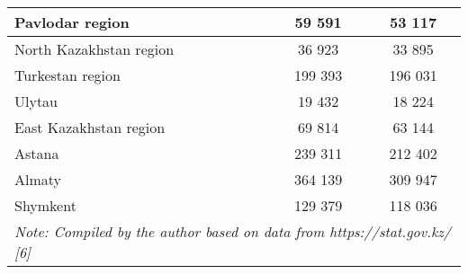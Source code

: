 \begin{table}[H]
\begin{tabular}{|lcc|}
\multicolumn{1}{|l|}{Pavlodar region}         & \multicolumn{1}{c|}{59 591}        & 53 117                       \\ \hline
\multicolumn{1}{|l|}{North Kazakhstan region} & \multicolumn{1}{c|}{36 923}        & 33 895                       \\ \hline
\multicolumn{1}{|l|}{Turkestan region}        & \multicolumn{1}{c|}{199 393}       & 196 031                      \\ \hline
\multicolumn{1}{|l|}{Ulytau}                  & \multicolumn{1}{c|}{19 432}        & 18 224                       \\ \hline
\multicolumn{1}{|l|}{East Kazakhstan region}  & \multicolumn{1}{c|}{69 814}        & 63 144                       \\ \hline
\multicolumn{1}{|l|}{Astana}                  & \multicolumn{1}{c|}{239 311}       & 212 402                      \\ \hline
\multicolumn{1}{|l|}{Almaty}                  & \multicolumn{1}{c|}{364 139}       & 309 947                      \\ \hline
\multicolumn{1}{|l|}{Shymkent}                & \multicolumn{1}{c|}{129 379}       & 118 036                      \\ \hline
\multicolumn{3}{|l|}{\textit{Note: Compiled by the author based on data from https://stat.gov.kz/ {[}6{]}}}       \\ \hline
\end{tabular}
\end{table}

